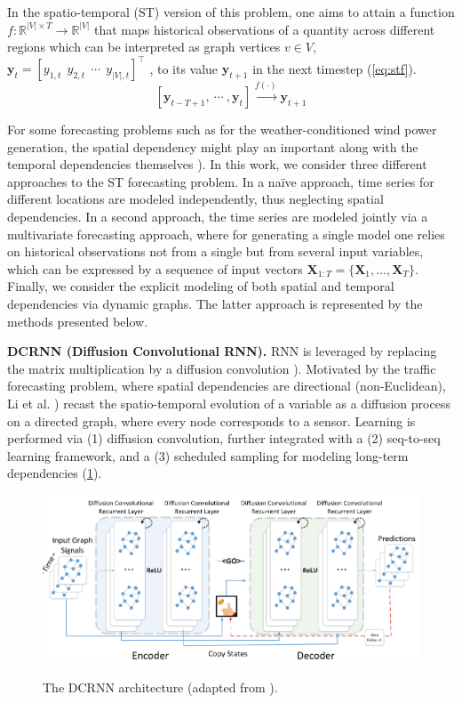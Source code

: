 In the spatio-temporal (ST) version of this problem, one aims to attain a function $f: \mathbb{R}^{|V|\times T} \rightarrow \mathbb{R}^{|V|}$ that maps historical observations of a quantity across different regions which can be interpreted as graph vertices $v\in V$, $\boldsymbol{y}_t = [y_{1,t}\  \  y_{2,t}\ \ \cdots \ \ y_{|V|,t}]^\top$ ,  to its value $\boldsymbol{y}_{t+1}$ in the next timestep  (\ref{eq:stf}).
\begin{equation}\label{eq:stf}
    [\boldsymbol{y}_{t-T+1}, \  \cdots\ , \boldsymbol{y}_{t}] \xrightarrow{f(\cdot)} \boldsymbol{y}_{t+1}
\end{equation}

For some forecasting problems such as for the weather-conditioned wind power generation, the spatial dependency might play an important along with the temporal dependencies themselves \cite{engeland2017variability}). In this work, we consider three different approaches to the ST forecasting problem. In a naïve approach, time series for different locations are modeled independently, thus neglecting spatial dependencies. In a second approach, the time series are modeled jointly via a multivariate forecasting approach, where for generating a single model one relies on historical observations not from a single but from several input variables, which can be expressed by a sequence of input vectors $\boldsymbol{X}_{1:T} = \{\boldsymbol{X}_1, ..., \boldsymbol{X}_T\}$.  Finally, we consider the explicit modeling of both spatial and temporal dependencies via dynamic graphs. The latter approach is represented by the methods presented below.

\vspace{1em}
\noindent
\textbf{DCRNN (Diffusion Convolutional RNN).} RNN is leveraged by replacing the matrix multiplication by a diffusion convolution \cite{liu2020intro}). Motivated by the traffic forecasting problem, where spatial dependencies are directional (non-Euclidean), Li et al. \cite{li2018dcrnn}) recast the spatio-temporal evolution of a variable as a diffusion process on a directed graph, where every node corresponds to a sensor. Learning is performed via (1) diffusion convolution, further integrated with a (2) seq-to-seq learning framework, and a (3) scheduled sampling for modeling long-term dependencies (\ref{fig:dcrnn}).
\begin{figure}[H]
	\centering
 	  \caption{The DCRNN architecture (adapted from \cite{li2018dcrnn}).}
		\includegraphics[scale=0.45]{dcrnn.png}
	\label{fig:dcrnn}
\end{figure}

